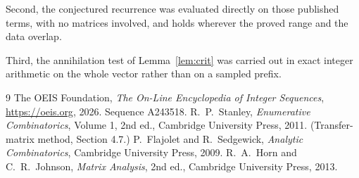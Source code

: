 \documentclass[11pt,a4paper]{article}
\theoremstyle{plain}
\theoremstyle{definition}
\begin{document}
Second, the conjectured recurrence was evaluated directly on those published terms, with no
matrices involved, and holds wherever the proved range and the data overlap.

Third, the annihilation test of Lemma~\ref{lem:crit} was carried out in exact integer
arithmetic on the whole vector rather than on a sampled prefix.

\begin{thebibliography}{9}
 The OEIS Foundation, \emph{The On-Line Encyclopedia of Integer
Sequences}, \url{https://oeis.org}, 2026. Sequence A243518.
 R.~P.~Stanley, \emph{Enumerative Combinatorics}, Volume 1, 2nd ed.,
Cambridge University Press, 2011. (Transfer-matrix method, Section 4.7.)
 P.~Flajolet and R.~Sedgewick, \emph{Analytic Combinatorics}, Cambridge
University Press, 2009.
 R.~A.~Horn and C.~R.~Johnson, \emph{Matrix Analysis}, 2nd ed., Cambridge
University Press, 2013.
\end{thebibliography}
\end{document}
